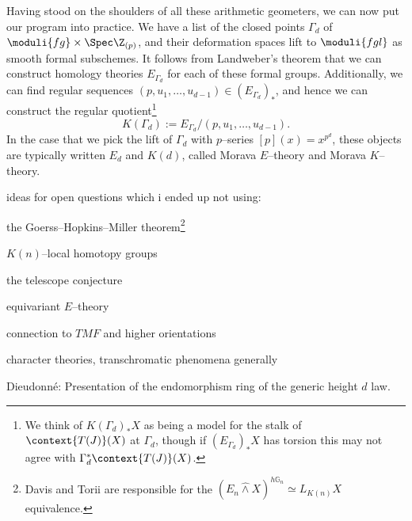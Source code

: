 

Having stood on the shoulders of all these arithmetic geometers, we can now put our program into practice.  We have a list of the closed points $\Gamma_d$ of $\moduli{fg} \times \Spec \Z_{(p)}$, and their deformation spaces lift to $\moduli{fgl}$ as smooth formal subschemes.  It follows from Landweber's theorem that we can construct homology theories $E_{\Gamma_d}$ for each of these formal groups.  Additionally, we can find regular sequences $(p, u_1, \ldots, u_{d-1}) \in (E_{\Gamma_d})_*$, and hence we can construct the regular quotient\footnote{We think of $K(\Gamma_d)_* X$ as being a model for the stalk of $\context{T(J)}(X)$ at $\Gamma_d$, though if $(E_{\Gamma_d})_* X$ has torsion this may not agree with $\Gamma_d^* \context{T(J)}(X)$.} \[K(\Gamma_d) := E_{\Gamma_d} / (p, u_1, \ldots, u_{d-1}).\]  In the case that we pick the lift of $\Gamma_d$ with $p$--series $[p](x) = x^{p^d}$, these objects are typically written $E_d$ and $K(d)$, called Morava $E$--theory and Morava $K$--theory.










\oldsection*{-------------------------}




ideas for open questions which i ended up not using:


the Goerss--Hopkins--Miller theorem\footnote{Davis and Torii are responsible for the $(E_n \hat\wedge X)^{h\mathbb G_n} \simeq L_{K(n)} X$ equivalence.}

$K(n)$--local homotopy groups

the telescope conjecture

equivariant $E$--theory

connection to $TMF$ and higher orientations

character theories, transchromatic phenomena generally

Dieudonn\'e: Presentation of the endomorphism ring of the generic height $d$ law.


\newpage
\oldsection*{-----------------------------}

